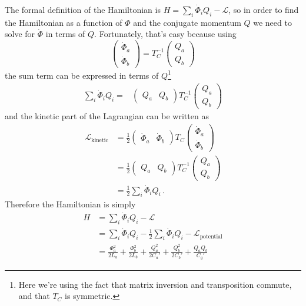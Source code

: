 The formal definition of the Hamiltonian is $H = \sum_i \dot \Phi_i Q_i - \mathcal{L}$, so in order to find the Hamiltonian as a function of $\Phi$ and the conjugate momentum $Q$ we need to solve for $\dot \Phi$ in terms of $Q$.
Fortunately, that's easy because using
\begin{equation*}
  \left( \begin{array}{c} \dot \Phi_a \\ \dot \Phi_b \end{array} \right)
  =
  T_C^{-1}
  \left( \begin{array}{c} Q_a \\ Q_b \end{array} \right)
\end{equation*}
the sum term can be expressed in terms of $Q$\footnote{Here we're using the fact that matrix inversion and transposition commute, and that $T_C$ is symmetric.}
\begin{align*}
  \sum_i \dot \Phi_i Q_i
  =& \left( \begin{array}{cc} Q_a & Q_b \end{array} \right)
  T_C^{-1}
  \left( \begin{array}{c} Q_a \\ Q_b \end{array} \right)
\end{align*}
and the kinetic part of the Lagrangian can be written as
\begin{align*}
  \mathcal{L}_\text{kinetic}
  &= \frac{1}{2}
    \left( \begin{array}{cc} \dot{\Phi}_a & \dot{\Phi}_b \end{array} \right)
    T_C
    \left( \begin{array}{c} \dot{\Phi}_a \\ \dot{\Phi}_b \end{array} \right) \\
  &= \frac{1}{2} 
    \left( \begin{array}{cc} Q_a & Q_b \end{array} \right)
    T_C^{-1}
    \left( \begin{array}{c} Q_a \\ Q_b \end{array} \right) \\
  &= \frac{1}{2} \sum_i \dot \Phi_i Q_i
    \, .
\end{align*}
Therefore the Hamiltonian is simply
\begin{align*}
  H
  &= \sum_i \dot \Phi_i Q_i - \mathcal{L} \\
  &= \sum_i \dot \Phi_i Q_i - \frac{1}{2} \sum_i \dot \Phi_i Q_i - \mathcal{L}_\text{potential} \\
  &=
    \frac{\Phi_a^2}{2 L_a}
  + \frac{\Phi_b^2}{2 L_b}
  + \frac{Q_a^2}{2 C_a'}
  + \frac{Q_b^2}{2 C_b'}
  + \frac{Q_a Q_b}{C_g'}
\end{align*}
